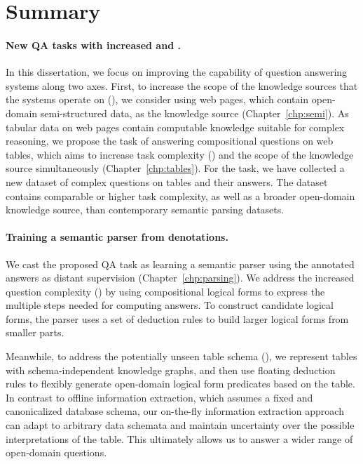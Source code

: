 \section{Summary}

\paragraph{New QA tasks with increased \Breadth and \Depth.}
In this dissertation, we focus on improving the capability
of question answering systems
along two axes.
First, to increase the scope of the knowledge sources
that the systems operate on
(\Breadth), we consider using web pages,
which contain open-domain semi-structured data,
as the knowledge source
(Chapter~\ref{chp:semi}).
As tabular data on web pages contain computable knowledge
suitable for complex reasoning,
we propose the task of answering compositional questions
on web tables,
which aims to increase task complexity (\Depth)
and the scope of the knowledge source simultaneously
(Chapter~\ref{chp:tables}).
For the task,
we have collected a new \wtq dataset of complex questions
on tables and their answers.
The dataset contains comparable or higher task complexity,
as well as a broader open-domain knowledge source,
than contemporary semantic parsing datasets.

\paragraph{Training a semantic parser from denotations.}
We cast the proposed QA task as learning
a semantic parser using the annotated answers as
distant supervision (Chapter~\ref{chp:parsing}).
We address the increased question complexity (\Depth)
by using compositional logical forms
to express the multiple steps needed for computing answers.
To construct candidate logical forms,
the parser uses a set of deduction rules
to build larger logical forms from smaller parts.

Meanwhile, to address the potentially unseen
table schema (\Breadth),
we represent tables with
schema-independent knowledge graphs,
and then use floating deduction rules to flexibly generate
open-domain logical form predicates
based on the table.
In contrast to offline information extraction,
which assumes a fixed and canonicalized database schema,
our on-the-fly information extraction approach
can adapt to arbitrary data schemata and
maintain uncertainty over the possible interpretations
of the table.
This ultimately allows us to answer a wider range
of open-domain questions.

